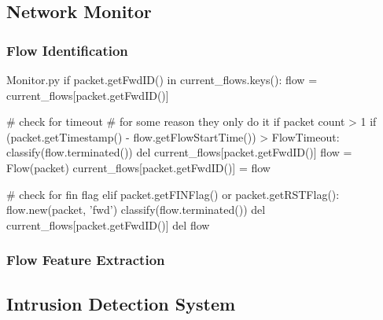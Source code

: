 
\subsection{Network Monitor}
\label{subsec:monitor-implementation}

\textcolor{dimgray}{\lipsum[1]}


\subsubsection{Flow Identification}
\label{subsubsec:nm-flow-id}

\textcolor{dimgray}{\lipsum[1]}

\begin{code}[colback=white]{Monitor.py}
if packet.getFwdID() in current_flows.keys():
flow = current_flows[packet.getFwdID()]

# check for timeout
# for some reason they only do it if packet count > 1
if (packet.getTimestamp() - flow.getFlowStartTime()) > FlowTimeout:
    classify(flow.terminated())
    del current_flows[packet.getFwdID()]
    flow = Flow(packet)
    current_flows[packet.getFwdID()] = flow

# check for fin flag
elif packet.getFINFlag() or packet.getRSTFlag():
    flow.new(packet, 'fwd')
    classify(flow.terminated())
    del current_flows[packet.getFwdID()]
    del flow
\end{code}

\textcolor{dimgray}{\lipsum[1]}


\subsubsection{Flow Feature Extraction}
\label{subsubsec:nm-flow-extraction}


\subsection{Intrusion Detection System}
\label{subsec:ids-implementation}

